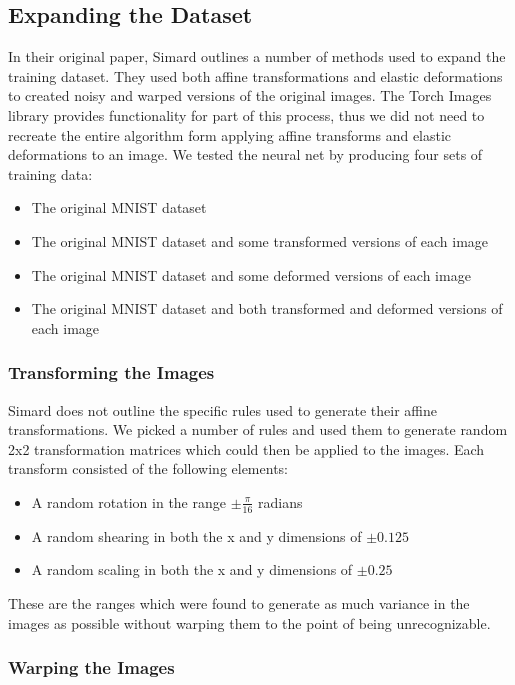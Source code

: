 \documentclass{article}
\begin{document}
\subsection{Expanding the Dataset}
In their original paper, Simard outlines a number of methods used to expand the training dataset. They used both affine transformations and elastic deformations to created noisy and warped versions of the original images. The Torch Images library provides functionality for part of this process, thus we did not need to recreate the entire algorithm form applying affine transforms and elastic deformations to an image. We tested the neural net by producing four sets of training data:
\begin{itemize}
  \item The original MNIST dataset
  \item The original MNIST dataset and some transformed versions of each image
  \item The original MNIST dataset and some deformed versions of each image
  \item The original MNIST dataset and both transformed and deformed versions of each image
\end{itemize}

\subsubsection{Transforming the Images}
Simard does not outline the specific rules used to generate their affine transformations. We picked a number of rules and used them to generate random 2x2 transformation matrices which could then be applied to the images. Each transform consisted of the following elements:
\begin{itemize}
  \item A random rotation in the range $\pm\frac{\pi}{16}$ radians
  \item A random shearing in both the x and y dimensions of $\pm 0.125$
  \item A random scaling in both the x and y dimensions of $\pm 0.25$
\end{itemize}

These are the ranges which were found to generate as much variance in the images as possible without warping them to the point of being unrecognizable.

\subsubsection{Warping the Images}
\end{document}
